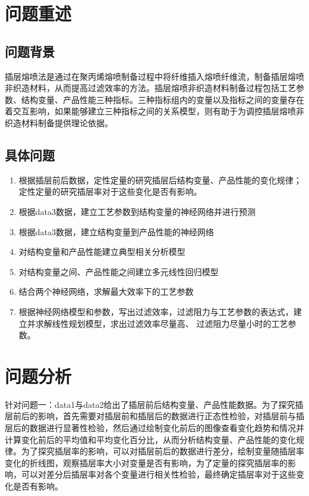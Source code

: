 \documentclass[withoutpreface,bwprint]{cumcmthesis} %
\begin{document}

\section{问题重述}
\subsection{问题背景}
插层熔喷法是通过在聚丙烯熔喷制备过程中将纤维插入熔喷纤维流，制备插层熔喷非织造材料，从而提高过滤效率的方法。插层熔喷非织造材料制备过程包括工艺参数、结构变量、产品性能三种指标。三种指标组内的变量以及指标之间的变量存在着交互影响，如果能够建立三种指标之间的关系模型，则有助于为调控插层熔喷非织造材料制备提供理论依据。

	
\subsection{具体问题}

\begin{enumerate}
	\item 根据插层前后数据，定性定量的研究插层后结构变量、产品性能的变化规律；定性定量的研究插层率对于这些变化是否有影响。
	\item 根据data3数据，建立工艺参数到结构变量的神经网络并进行预测
	\item 根据data3数据，建立结构变量到产品性能的神经网络
	\item 对结构变量和产品性能建立典型相关分析模型
	\item 对结构变量之间、产品性能之间建立多元线性回归模型
	\item 结合两个神经网络，求解最大效率下的工艺参数
	\item 根据神经网络模型和参数，写出过滤效率，过滤阻力与工艺参数的表达式，建立并求解线性规划模型，求出过滤效率尽量高、
过滤阻力尽量小时的工艺参数。
\end{enumerate}


\section{问题分析}
   针对问题一：data1与data2给出了插层前后结构变量、产品性能数据。为了探究插层前后的影响，首先需要对插层前和插层后的数据进行正态性检验，对插层前与插层后的数据进行显著性检验，然后通过绘制变化前后的图像查看变化趋势和情况并计算变化前后的平均值和平均变化百分比，从而分析结构变量、产品性能的变化规律。为了探究插层率的影响，可以对插层前后的数据进行差分，绘制变量随插层率变化的折线图，观察插层率大小对变量是否有影响，为了定量的探究插层率的影响，可以对差分后插层率对各个变量进行相关性检验，最终确定插层率对于这些变化是否有影响。
   
\end{document}
